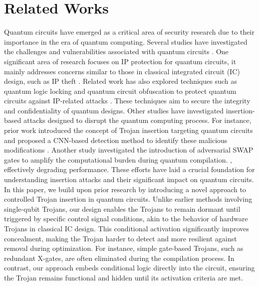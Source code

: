 \section{Related Works}
Quantum circuits have emerged as a critical area of security research due to their importance in the era of quantum computing. Several studies have investigated the challenges and vulnerabilities associated with quantum circuits \cite{ghosh2023primer}. One significant area of research focuses on IP protection for quantum circuits, it mainly addresses concerns similar to those in classical integrated circuit (IC) design, such as IP theft \cite{aboy2022mapping}. Related work has also explored techniques such as quantum logic locking and quantum circuit obfuscation to protect quantum circuits against IP-related attacks \cite{das2023randomized, suresh2021short, topaloglu2023quantum}. These techniques aim to secure the integrity and confidentiality of quantum designs.
Other studies have investigated insertion-based attacks designed to disrupt the quantum computing process. For instance, prior work \cite{roy2024hardware} introduced the concept of Trojan insertion targeting quantum circuits and proposed a CNN-based detection method to identify these malicious modifications \cite{das2023trojannet}. Another study investigated the introduction of adversarial SWAP gates to amplify the computational burden during quantum compilation. \cite{upadhyay2024stealthy}, effectively degrading performance. These efforts have laid a crucial foundation for understanding insertion attacks and their significant impact on quantum circuits.
In this paper, we build upon prior research by introducing a novel approach to controlled Trojan insertion in quantum circuits. Unlike earlier methods involving single-qubit Trojans, our design enables the Trojans to remain dormant until triggered by specific control signal conditions, akin to the behavior of hardware Trojans in classical IC design. This conditional activation significantly improves concealment, making the Trojan harder to detect and more resilient against removal during optimization. For instance, simple gate-based Trojans, such as redundant X-gates, are often eliminated during the compilation process. In contrast, our approach embeds conditional logic directly into the circuit, ensuring the Trojan remains functional and hidden until its activation criteria are met.